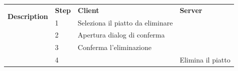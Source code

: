\begin{table}[H]
\begin{tabularx}{\linewidth}{|l|X|X|X|}
    \hline \multirow{2}{*}{\textbf{Description}} & \textbf{Step}                                                                     &
    \textbf{Client}                              & \textbf{Server}                                                                                                                          \\
    \cline{2-4}                                  & 1                                                                                 & Seleziona il piatto da eliminare &                   \\
    \cline{2-4}                                  & 2                                                                                 & Apertura dialog di conferma      &                   \\
    \cline{2-4}                                  & 3                                                                                 & Conferma l'eliminazione          &                   \\
    \cline{2-4}                                  & 4                                                                                 &                                  & Elimina il piatto \\
    \hline
  \end{tabularx}
\end{table}

